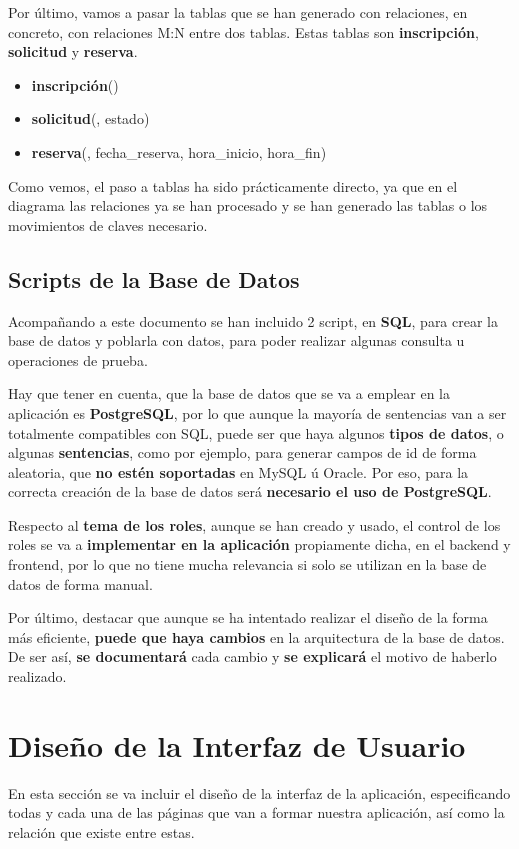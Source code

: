 Por último, vamos a pasar la tablas que se han generado con relaciones, en concreto, con relaciones M:N entre dos tablas. Estas tablas son \textbf{	inscripción}, \textbf{solicitud} y \textbf{reserva}.

\begin{itemize}
	\item \textbf{inscripción}(\uline{})
	\item \textbf{solicitud}(\uline{}, estado)
	\item \textbf{reserva}(\uline{}, fecha\_reserva, hora\_inicio, hora\_fin)
\end{itemize} 

Como vemos, el paso a tablas ha sido prácticamente directo, ya que en el diagrama las relaciones ya se han procesado y se han generado las tablas o los movimientos de claves necesario.

\subsection{Scripts de la Base de Datos}
Acompañando a este documento se han incluido 2 script, en \textbf{SQL}, para crear la base de datos y poblarla con datos, para poder realizar algunas consulta u operaciones de prueba.

Hay que tener en cuenta, que la base de datos que se va a emplear en la aplicación es \textbf{PostgreSQL}, por lo que aunque la mayoría de sentencias van a ser totalmente compatibles con SQL, puede ser que haya algunos \textbf{tipos de datos}, o algunas \textbf{sentencias}, como por ejemplo, para generar campos de id de forma aleatoria, que \textbf{no estén soportadas} en MySQL ú Oracle. Por eso, para la correcta creación de la base de datos será \textbf{necesario el uso de PostgreSQL}.

Respecto al \textbf{tema de los roles}, aunque se han creado y usado, el control de los roles se va a \textbf{implementar en la aplicación} propiamente dicha, en el backend y frontend, por lo que no tiene mucha relevancia si solo se utilizan en la base de datos de forma manual.

Por último, destacar que aunque se ha intentado realizar el diseño de la forma más eficiente, \textbf{puede que haya cambios} en la arquitectura de la base de datos. De ser así, \textbf{se documentará} cada cambio y \textbf{se explicará }el motivo de haberlo  realizado. 

\section{Diseño de la Interfaz de Usuario}
En esta sección se va incluir el diseño de la interfaz de la aplicación, especificando todas y cada una de las páginas que van a formar nuestra aplicación, así como la relación que existe entre estas. 

